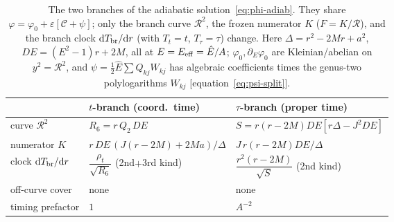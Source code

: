 \documentclass[12pt]{iopart}
\theoremstyle{plain}
\theoremstyle{definition}
\theoremstyle{remark}
\newcommand{\Ehat}{\hat E}
\newcommand{\dd}{\mathrm{d}}
\begin{document}
\begin{table}[htbp]
    \centering
    \caption{The two branches of the adiabatic solution~\eqref{eq:phi-adiab}. They
    share $\varphi=\varphi_0+\varepsilon[\mathcal{C}+\psi]$;
    only the branch curve $\mathcal{R}^2$, the frozen numerator $K$
    ($F=K/\mathcal{R}$), and the branch clock $\dd T_{\rm br}/\dd r$ (with $T_t=t$,
    $T_\tau=\tau$) change. Here
    $\Delta=r^2-2Mr+a^2$, $DE=(E^2-1)r+2M$, all at $E=E_{\rm eff}=\Ehat/A$;
    $\varphi_0,\partial_E\varphi_0$ are Kleinian/abelian on $y^2=\mathcal{R}^2$, and
    $\psi=\tfrac12\Ehat\sum Q_{kj}W_{kj}$ has algebraic coefficients times the
    genus-two polylogarithms $W_{kj}$ [equation~\eqref{eq:psi-split}].}
    \label{tab:branch-adiab}
    \begin{tabular}{lll}
        \hline\hline
         & $t$-branch (coord.\ time) & $\tau$-branch (proper time)\\
        \hline
        curve $\mathcal{R}^2$ & $R_6=r\,Q_2\,DE$ & $S=r(r{-}2M)DE[r\Delta{-}J^2DE]$\\
        numerator $K$ & $r\,DE\,(J(r{-}2M){+}2Ma)/\Delta$ & $J\,r(r{-}2M)DE/\Delta$\\
        clock $\dd T_{\rm br}/\dd r$ & $\dfrac{\rho_t}{\sqrt{R_6}}$ (2nd$+$3rd kind)
            & $\dfrac{r^2(r-2M)}{\sqrt{S}}$ (2nd kind)\\[4pt]
        off-curve cover & none & none\\
        timing prefactor & $1$ & $A^{-2}$\\
        \hline\hline
    \end{tabular}
\end{table}
\end{document}
